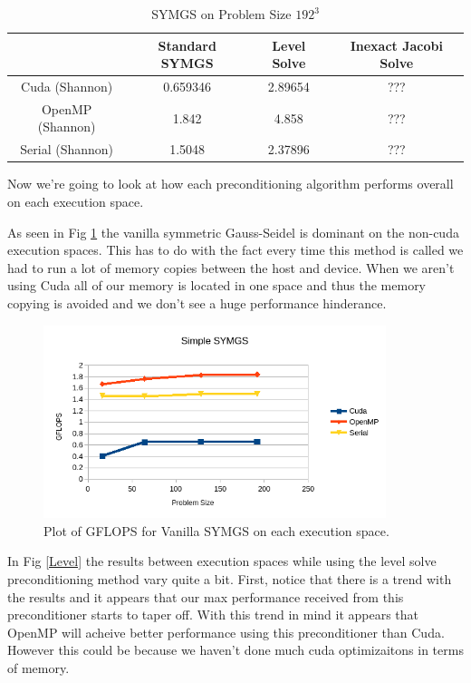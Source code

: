 \documentclass{ccr15}
\begin{document}
\begin{table}[h]
\begin{center}
\begin{tabular}{|c||c|c|c|}
\hline
& Standard SYMGS & Level Solve & Inexact Jacobi Solve \\
\hline \hline
Cuda (Shannon) & 0.659346 & 2.89654 & ??? \\
\hline
OpenMP (Shannon) & 1.842 & 4.858 & ??? \\
\hline
Serial (Shannon) & 1.5048 & 2.37896 & ??? \\
\hline
\end{tabular}
\caption{SYMGS on Problem Size $192^3$}
\label{SYMGS192}
\end{center}
\end{table}

Now we're going to look at how each preconditioning algorithm performs overall on each execution
space.

As seen in Fig \ref{Vanilla} the vanilla symmetric Gauss-Seidel is dominant on the non-cuda
execution spaces. This has to do with the fact every time this method is called we had to run
a lot of memory copies between the host and device. When we aren't using Cuda all of our memory
is located in one space and thus the memory copying is avoided and we don't see a huge
performance hinderance.

\begin{figure}[H]
  \centering
  \includegraphics[width=10cm]{plots/ZAB-VanillaSYMGS.png}
  \caption{Plot of GFLOPS for Vanilla SYMGS on each execution space.}
  \label{Vanilla}
\end{figure}

In Fig \ref{Level} the results between execution spaces while using the level solve
preconditioning method vary quite a bit. First, notice that there is a trend with the results and
it appears that our max performance received from this preconditioner starts to taper off. With
this trend in mind it appears that OpenMP will acheive better performance using this
preconditioner than Cuda. However this could be because we haven't done much cuda optimizaitons
in terms of memory.
\end{document}
